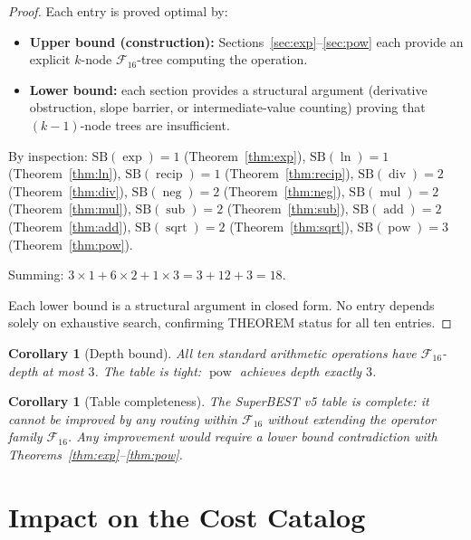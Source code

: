 \documentclass[12pt,a4paper]{article}
\newtheorem{corollary}[theorem]{Corollary}
\theoremstyle{definition}
\newcommand{\recip}{\operatorname{recip}}
\newcommand{\divop}{\operatorname{div}}
\newcommand{\mulop}{\operatorname{mul}}
\newcommand{\subop}{\operatorname{sub}}
\newcommand{\addop}{\operatorname{add}}
\newcommand{\negop}{\operatorname{neg}}
\newcommand{\powop}{\operatorname{pow}}
\newcommand{\sqrtop}{\operatorname{sqrt}}
\newcommand{\SB}{\mathrm{SB}}
\newcommand{\F}{\mathcal{F}_{16}}
\begin{document}
\begin{proof}
Each entry is proved optimal by:
\begin{itemize}
  \item \textbf{Upper bound (construction):} Sections~\ref{sec:exp}--\ref{sec:pow}
    each provide an explicit $k$-node $\F$-tree computing the operation.
  \item \textbf{Lower bound:} each section provides a structural argument
    (derivative obstruction, slope barrier, or intermediate-value counting)
    proving that $(k-1)$-node trees are insufficient.
\end{itemize}
By inspection:
$\SB(\exp) = 1$ (Theorem~\ref{thm:exp}),
$\SB(\ln) = 1$ (Theorem~\ref{thm:ln}),
$\SB(\recip) = 1$ (Theorem~\ref{thm:recip}),
$\SB(\divop) = 2$ (Theorem~\ref{thm:div}),
$\SB(\negop) = 2$ (Theorem~\ref{thm:neg}),
$\SB(\mulop) = 2$ (Theorem~\ref{thm:mul}),
$\SB(\subop) = 2$ (Theorem~\ref{thm:sub}),
$\SB(\addop) = 2$ (Theorem~\ref{thm:add}),
$\SB(\sqrtop) = 2$ (Theorem~\ref{thm:sqrt}),
$\SB(\powop) = 3$ (Theorem~\ref{thm:pow}).

Summing: $3 \times 1 + 6 \times 2 + 1 \times 3 = 3 + 12 + 3 = 18$.

Each lower bound is a structural argument in closed form.
No entry depends solely on exhaustive search, confirming THEOREM status
for all ten entries.
\end{proof}

\begin{corollary}[Depth bound]
\label{cor:depth}
All ten standard arithmetic operations have $\mathcal{F}_{16}$-depth at most $3$.
The table is tight: $\powop$ achieves depth exactly $3$.
\end{corollary}

\begin{corollary}[Table completeness]
\label{cor:complete}
The SuperBEST v5 table is \emph{complete}: it cannot be improved by any routing
within $\mathcal{F}_{16}$ without extending the operator family $\F$.
Any improvement would require a lower bound contradiction with
Theorems~\ref{thm:exp}--\ref{thm:pow}.
\end{corollary}

\section{Impact on the Cost Catalog}
\label{sec:impact}
\end{document}
